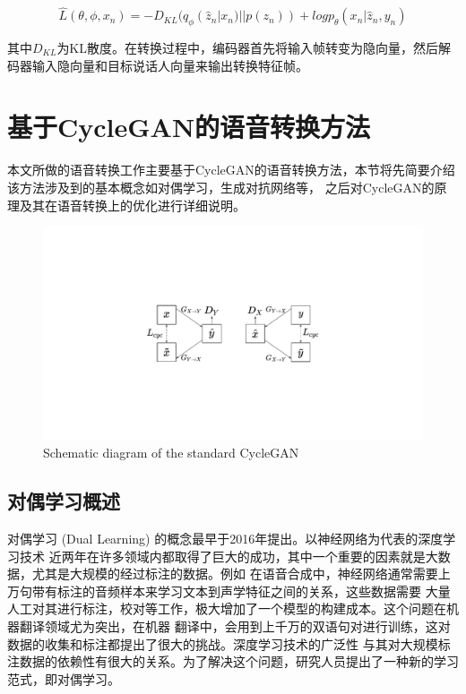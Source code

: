 \begin{equation}
    \hat{L}(\theta,\phi,x_n)=-D_{KL}(q_{\phi}(\hat{z}_n|x_n)||p(z_n))+logp_{\theta}(x_n|\hat{z}_n,y_n)
\end{equation}

其中$D_{KL}$为KL散度。在转换过程中，编码器首先将输入帧转变为隐向量，然后解码器输入隐向量和目标说话人向量来输出转换特征帧。


\section{基于CycleGAN的语音转换方法}
本文所做的语音转换工作主要基于CycleGAN的语音转换方法，本节将先简要介绍该方法涉及到的基本概念如对偶学习，生成对抗网络等，
之后对CycleGAN的原理及其在语音转换上的优化进行详细说明。

\begin{figure}[!htp]
    \centering
    \includegraphics[width=13cm,trim=100 140 100 140,clip]{figure/3_cyclegan.pdf}
    {Schematic diagram of the standard CycleGAN}
    \label{fig:cyclegan}
\end{figure}

\subsection{对偶学习概述}
对偶学习 (Dual Learning) 的概念最早于2016年提出\cite{he2016dual}。以神经网络为代表的深度学习技术
近两年在许多领域内都取得了巨大的成功，其中一个重要的因素就是大数据，尤其是大规模的经过标注的数据。例如
在语音合成中，神经网络通常需要上万句带有标注的音频样本来学习文本到声学特征之间的关系，这些数据需要
大量人工对其进行标注，校对等工作，极大增加了一个模型的构建成本。这个问题在机器翻译领域尤为突出，在机器
翻译中，会用到上千万的双语句对进行训练，这对数据的收集和标注都提出了很大的挑战。深度学习技术的广泛性
与其对大规模标注数据的依赖性有很大的关系。为了解决这个问题，研究人员提出了一种新的学习范式，即对偶学习。

